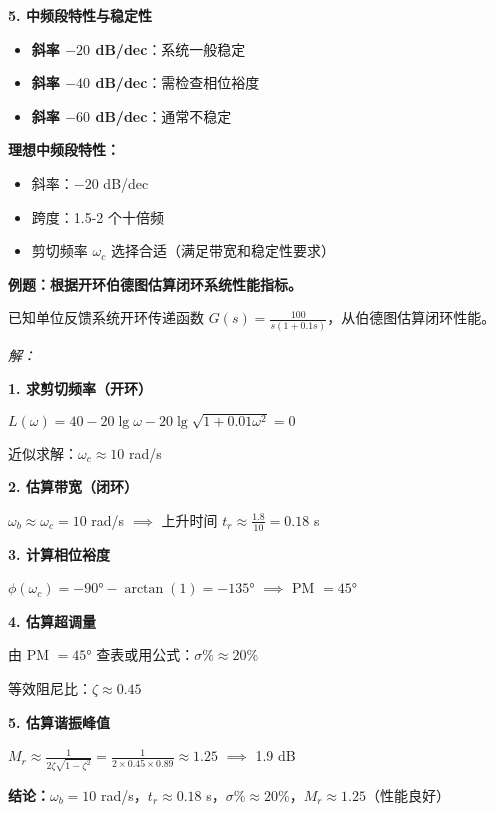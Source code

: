 \begin{minipage}[t]{0.45\textwidth}
\vspace{0.2cm}
\textbf{5. 中频段特性与稳定性}

\begin{itemize}
    \item \textbf{斜率 $-20$ dB/dec}：系统一般稳定
    \item \textbf{斜率 $-40$ dB/dec}：需检查相位裕度
    \item \textbf{斜率 $-60$ dB/dec}：通常不稳定
\end{itemize}

\textbf{理想中频段特性：}
\begin{itemize}
    \item 斜率：$-20$ dB/dec
    \item 跨度：1.5-2 个十倍频
    \item 剪切频率 $\omega_c$ 选择合适（满足带宽和稳定性要求）
\end{itemize}
\end{minipage}

\vspace{0.3cm}
\textbf{例题：根据开环伯德图估算闭环系统性能指标。}

已知单位反馈系统开环传递函数 $G(s) = \frac{100}{s(1+0.1s)}$，从伯德图估算闭环性能。

\textit{解：}

\textbf{1. 求剪切频率（开环）}

$L(\omega) = 40 - 20\lg\omega - 20\lg\sqrt{1+0.01\omega^2} = 0$

近似求解：$\omega_c \approx 10$ rad/s

\textbf{2. 估算带宽（闭环）}

$\omega_b \approx \omega_c = 10$ rad/s $\implies$ 上升时间 $t_r \approx \frac{1.8}{10} = 0.18$ s

\textbf{3. 计算相位裕度}

$\phi(\omega_c) = -90° - \arctan(1) = -135°$ $\implies$ PM $= 45°$

\textbf{4. 估算超调量}

由 PM $= 45°$ 查表或用公式：$\sigma\% \approx 20\%$

等效阻尼比：$\zeta \approx 0.45$

\textbf{5. 估算谐振峰值}

$M_r \approx \frac{1}{2\zeta\sqrt{1-\zeta^2}} = \frac{1}{2 \times 0.45 \times 0.89} \approx 1.25$ $\implies$ 1.9 dB

\textbf{结论：}$\omega_b = 10$ rad/s，$t_r \approx 0.18$ s，$\sigma\% \approx 20\%$，$M_r \approx 1.25$（性能良好）

